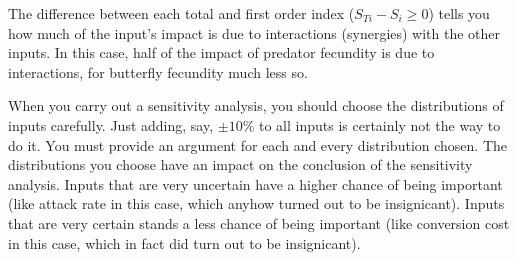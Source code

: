The difference between each total and first order index ($S_{Ti}-S_i \geq 0$) tells you how much of the input's impact is due to interactions (synergies) with the other inputs. In this case, half of the impact of predator fecundity is due to interactions, for butterfly fecundity much less so.

When you carry out a sensitivity analysis, you should choose the distributions of inputs carefully. Just adding, say, $\pm 10\%$ to all inputs is certainly not the way to do it. You must provide an argument for each and every distribution chosen. The distributions you choose have an impact on the conclusion of the sensitivity analysis. Inputs that are very uncertain have a higher chance of being important (like attack rate in this case, which anyhow turned out to be insignicant). Inputs that are very certain stands a less chance of being important (like conversion cost in this case, which in fact did turn out to be insignicant).